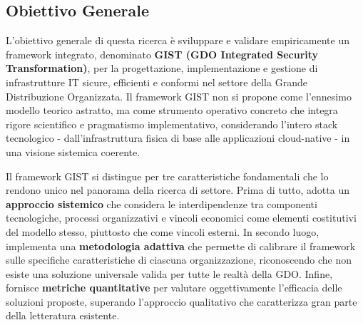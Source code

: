 \subsection{Obiettivo Generale}

L'obiettivo generale di questa ricerca è sviluppare e validare empiricamente un framework integrato, denominato \textbf{GIST (GDO Integrated Security Transformation)}, per la progettazione, implementazione e gestione di infrastrutture IT sicure, efficienti e conformi nel settore della Grande Distribuzione Organizzata. Il framework GIST non si propone come l'ennesimo modello teorico astratto, ma come strumento operativo concreto che integra rigore scientifico e pragmatismo implementativo, considerando l'intero stack tecnologico - dall'infrastruttura fisica di base alle applicazioni cloud-native - in una visione sistemica coerente.

Il framework GIST si distingue per tre caratteristiche fondamentali che lo rendono unico nel panorama della ricerca di settore. Prima di tutto, adotta un \textbf{approccio sistemico} che considera le interdipendenze tra componenti tecnologiche, processi organizzativi e vincoli economici come elementi costitutivi del modello stesso, piuttosto che come vincoli esterni. In secondo luogo, implementa una \textbf{metodologia adattiva} che permette di calibrare il framework sulle specifiche caratteristiche di ciascuna organizzazione, riconoscendo che non esiste una soluzione universale valida per tutte le realtà della GDO. Infine, fornisce \textbf{metriche quantitative} per valutare oggettivamente l'efficacia delle soluzioni proposte, superando l'approccio qualitativo che caratterizza gran parte della letteratura esistente.

